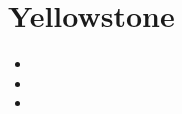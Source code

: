 
\section{Yellowstone}

\begin{small}
\begin{itemize}
\item[\twothousandthirteen]
\item[\twothousandsixteen]
\item[\twothousandeighteen]
\end{itemize}
\end{small}







